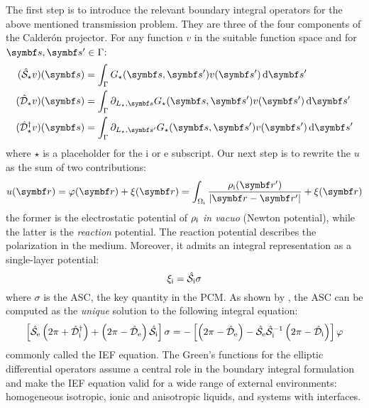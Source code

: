 The first step is to introduce the relevant boundary integral operators for the
above mentioned transmission problem.
They are three of the four components of the Calder\'on projector.
For any function $v$ in the suitable function space and for $\vect{s}, \vect{s}^\prime \in \Gamma$:
\begin{subequations}
\begin{align}
  (\bi{S}_\star v)(\vect{s}) &= \int_\Gamma
  G_\star(\vect{s}, \vect{s}^\prime)v(\vect{s}^\prime)\diff
  \vect{s}^\prime \label{eq:S} \\
  (\bi{D}_\star v)(\vect{s}) &= \int_\Gamma \partial_{L_\star,\vect{s}}
  G_\star(\vect{s}, \vect{s}^\prime)v(\vect{s}^\prime)\diff
  \vect{s}^\prime \label{eq:D} \\
  (\bi{D}^\dagger_\star v)(\vect{s}) &= \int_\Gamma
\partial_{L_\star,\vect{s}^\prime}
  G_\star(\vect{s}, \vect{s}^\prime)v(\vect{s}^\prime)\diff
  \vect{s}^\prime \label{eq:D-dagger}
\end{align}
\end{subequations}
where $\star$ is a placeholder for the $\mathrm{i}$ or $\mathrm{e}$ subscript.
Our next step is to rewrite the $u$ as the sum of two contributions:
\begin{equation}
  u(\vect{r}) = \esp(\vect{r}) + \xi(\vect{r}) = \int_{\Omegai}
  \frac{\rhoi(\vect{r}^\prime)}{|\vect{r}-\vect{r}^\prime|}
  + \xi(\vect{r})
\end{equation}
the former is the electrostatic potential of $\rho_\mathrm{i}$ \emph{in vacuo}
(Newton potential), while the latter is the \emph{reaction} potential.
The reaction potential describes the polarization in the medium.
Moreover, it admits an integral representation as a single-layer
potential:
\begin{equation}
  \xi_\mathrm{i} = \hat{\mathcal{S}}_\mathrm{i}\sigma
\end{equation}
where $\sigma$ is the \gls{ASC}, the key quantity in the \acrshort{PCM}.
As shown by \citeauthor{Cances1998-og}, the \acrshort{ASC} can be computed
as the \emph{unique} solution to the following integral equation:
\begin{equation}\label{eq:full-IEF}
  \left[ \hat{\mathcal{S}}_\mathrm{e}\left(2\pi + \hat{\mathcal{D}}^\dagger_\mathrm{i}\right)
  +
  \left(2\pi - \hat{\mathcal{D}}_\mathrm{e}\right)\hat{\mathcal{S}}_\mathrm{i}
  \right]\sigma =
  -\left[\left(2\pi-\hat{\mathcal{D}}_\mathrm{e}\right)
  -\hat{\mathcal{S}}_\mathrm{e}\hat{\mathcal{S}}_\mathrm{i}^{-1}
  \left(2\pi-\hat{\mathcal{D}}_\mathrm{i}\right)
  \right]\varphi
\end{equation}
commonly called the \gls{IEF} equation.
The Green's functions for the elliptic differential operators
assume a central role in the boundary integral formulation and make the
\acrshort{IEF} equation valid for a wide range of external
environments: homogeneous isotropic, ionic and anisotropic
liquids,\autocite{Cances1998-og}
and systems with interfaces.\autocite{Corni2002-dr, Frediani2004-er,
Delgado2013-kd, DiRemigio2016-nn}

